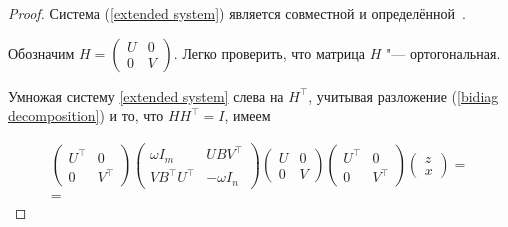 \begin{proof}

Система (\ref{extended system}) является совместной и определённой~{\cite{dolishzhdanov:bib:zhdanov}}.

Обозначим $H = \left( \begin{array}{cc} U & 0 \\

0 & V \end{array} \right)$. Легко проверить, что матрица $H$ "--- ортогональная. 

Умножая систему \eqref{extended system} слева на $H^\top   $, учитывая разложение (\ref{bidiag decomposition}) и то, что $H

H^\top    = I$, имеем

\begin{multline*}

\left( \begin{array}{cc} U^\top    & 0 \\ 0 & V^\top   

\end{array} \right)

\left(

\begin{array}{cc}

{\omega I_m} & {U B V^\top   } \\

{V B^\top    U^\top   } & {-\omega I_n}

\end{array}

\right) \left( \begin{array}{cc} U & 0 \\ 0 & V

\end{array} \right)

\left( \begin{array}{cc} U^\top    & 0 \\ 0 & V^\top   

\end{array} \right)

\left(

\begin{array}{c}

z \\ x

\end{array}

\right)

 = \\ =


\end{multline*}
\end{proof}
